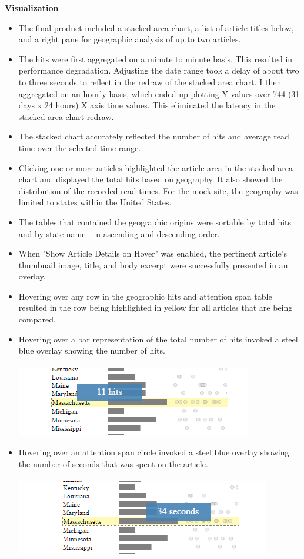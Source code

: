 \documentclass[12pt]{article}
\begin{document}
{\noindent\textbf{Visualization} 
\begin{itemize}
\item The final product included a stacked area chart, a list of article titles below, and a right pane for geographic analysis of up to two articles.
\item The hits were first aggregated on a minute to minute basis. This resulted in performance degradation. Adjusting the date range took a delay of about two to three seconds to reflect in the redraw of the stacked area chart. I then aggregated on an hourly basis, which ended up plotting Y values over 744 (31 days x 24 hours) X axis time values. This eliminated the latency in the stacked area chart redraw.
\item The stacked chart accurately reflected the number of hits and average read time over the selected time range.
\item Clicking one or more articles highlighted the article area in the stacked area chart and displayed the total hits based on geography. It also showed the distribution of the recorded read times. For the mock site, the geography was limited to states within the United States.
\item The tables that contained the geographic origins were sortable by total hits and by state name - in ascending and descending order.
\item When "Show Article Details on Hover" was enabled, the pertinent article's thumbnail image, title, and body excerpt were successfully presented in an overlay.
\item Hovering over any row in the geographic hits and attention span table resulted in the row being highlighted in yellow for all articles that are being compared.
\item Hovering over a bar representation of the total number of hits invoked a steel blue overlay showing the number of hits.
\\ \\
\noindent\includegraphics[scale=0.8]{img/state_hit_hover} \\  

\item Hovering over an attention span circle invoked a steel blue overlay showing the number of seconds that was spent on the article.
\\ \\
\noindent\includegraphics[scale=0.8]{img/state_circle_hover} \\  
\end{itemize} 

}
\end{document}
